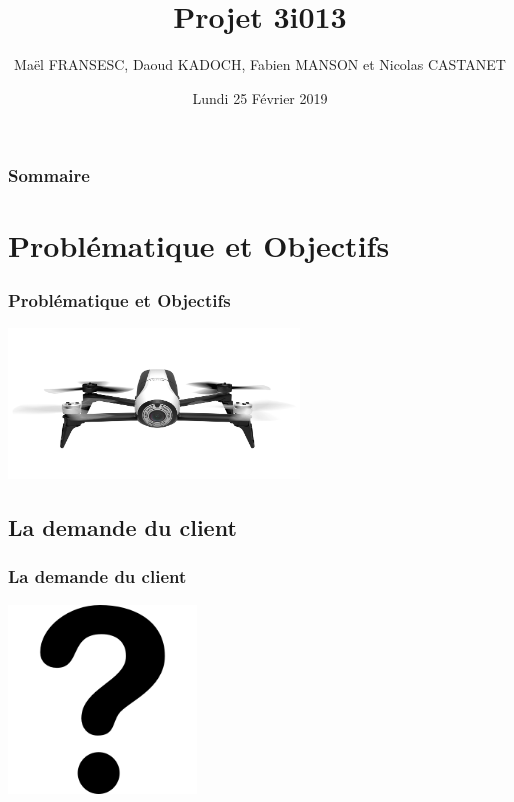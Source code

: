 \documentclass[11pt]{beamer}
\author{Maël FRANSESC, Daoud KADOCH, Fabien MANSON et Nicolas CASTANET}
\title{Projet 3i013}
\institute{Sorbonne Université}
\date{Lundi 25 Février 2019}
\begin{document}
\begin{frame}
\titlepage
\end{frame}

\begin{frame}
\frametitle{Sommaire}
\tableofcontents[sections={1-8}]
\end{frame}

\section{Problématique et Objectifs}
\begin{frame}
\frametitle{Problématique et Objectifs}
\begin{center}
\includegraphics[height=4cm]{bebop_face.jpg}
\end{center}
\end{frame}

\subsection{La demande du client}
\begin{frame}
\frametitle{La demande du client}
\begin{center}
\includegraphics[height=5cm]{point.png}
\end{center}

\end{frame}
\end{document}
